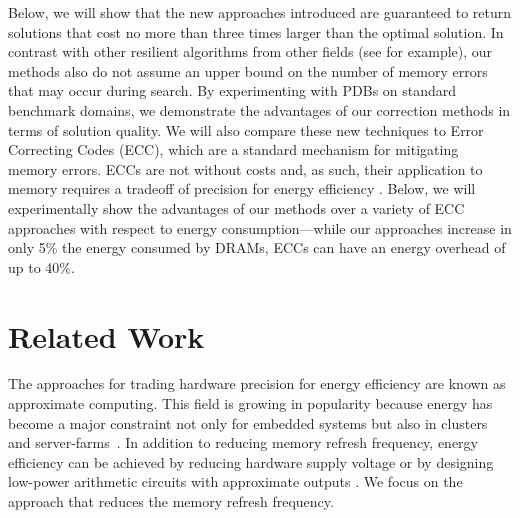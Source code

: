 \documentclass{article}
\begin{document}
Below, we will show that the new approaches introduced are guaranteed to return solutions that cost no more than three times larger than the optimal solution. In contrast with other resilient algorithms from other fields (see \cite{finocchi2007designing} for example), our methods also do not assume an upper bound on the number of memory errors that may occur during search. By experimenting with PDBs on standard benchmark domains, we demonstrate the advantages of our correction methods in terms of solution quality. We will also compare these new techniques to Error Correcting Codes (ECC), which are a standard mechanism for mitigating memory errors. ECCs are not without costs and, as such, their application to memory requires a tradeoff of precision for energy efficiency \cite{Luo:2014:CAM:2671853.2672438}. Below, we will experimentally show the advantages of our methods over a variety of ECC approaches with respect to energy consumption---while our approaches increase in only 5\% the energy consumed by DRAMs, ECCs can have an energy overhead of up to 40\%. 


\section{Related Work}


The approaches for trading hardware precision for energy efficiency are known as approximate computing. This field is growing in popularity because energy has become a major constraint not only for embedded systems but also in clusters and server-farms~\cite{Cameron2005}. 
%
In addition to reducing memory refresh frequency, energy efficiency can be achieved 
%
by reducing hardware supply voltage \cite{974895} or by designing low-power arithmetic circuits with approximate outputs \cite{5993675}. We focus on the approach that reduces the memory refresh frequency.  %
\end{document}
